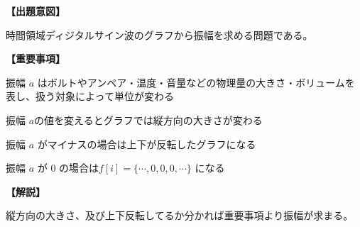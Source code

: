 \noindent \textbf{【出題意図】}

\noindent 時間領域ディジタルサイン波のグラフから振幅を求める問題である。

\vspace{1em}
\noindent \textbf{【重要事項】}

\bigskip
\noindent\quad 振幅 $a$ はボルトやアンペア・温度・音量などの物理量の大きさ・ボリュームを表し、扱う対象によって単位が変わる

\bigskip
\noindent\quad 振幅 $a$の値を変えるとグラフでは縦方向の大きさが変わる

\bigskip
\noindent\quad 振幅 $a$ がマイナスの場合は上下が反転したグラフになる

\bigskip
\noindent\quad 振幅 $a$ が $0$ の場合は$f[i]=\{\cdots,0,0,0,\cdots\}$ になる


\vspace{1em}
\noindent \textbf{【解説】}

\noindent 縦方向の大きさ、及び上下反転してるか分かれば重要事項より振幅が求まる。
